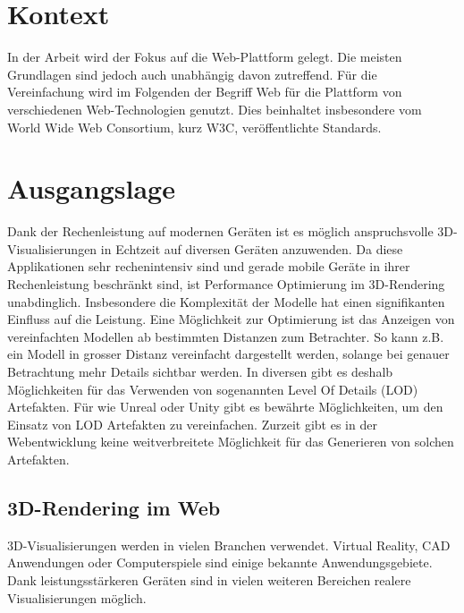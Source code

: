 
\section{Kontext}
In der Arbeit wird der Fokus auf die Web-Plattform gelegt. Die meisten Grundlagen sind jedoch auch unabhängig davon zutreffend.
Für die Vereinfachung wird im Folgenden der Begriff Web für die Plattform von verschiedenen Web-Technologien genutzt. Dies beinhaltet insbesondere vom World Wide Web Consortium, kurz W3C, veröffentlichte Standards.

\section{Ausgangslage}
Dank der Rechenleistung auf modernen Geräten ist es möglich anspruchsvolle 3D-Visualisierungen in Echtzeit auf diversen Geräten anzuwenden. Da diese Applikationen sehr rechenintensiv sind und gerade mobile Geräte in ihrer Rechenleistung beschränkt sind, ist Performance Optimierung im 3D-Rendering unabdinglich. Insbesondere die Komplexität der Modelle hat einen signifikanten Einfluss auf die Leistung.
Eine Möglichkeit zur Optimierung ist das Anzeigen von vereinfachten Modellen ab bestimmten Distanzen zum Betrachter. So kann z.B. ein Modell in grosser Distanz vereinfacht dargestellt werden, solange bei genauer Betrachtung mehr Details sichtbar werden.
In diversen  gibt es deshalb Möglichkeiten für das Verwenden von sogenannten Level Of Details (LOD) Artefakten.
Für  wie Unreal oder Unity gibt es bewährte Möglichkeiten, um den Einsatz von LOD Artefakten zu vereinfachen. Zurzeit gibt es in der Webentwicklung keine weitverbreitete Möglichkeit für das Generieren von solchen Artefakten.

\subsection{3D-Rendering im Web}
3D-Visualisierungen werden in vielen Branchen verwendet.
Virtual Reality, CAD Anwendungen oder Computerspiele sind einige bekannte Anwendungsgebiete.
Dank leistungsstärkeren Geräten sind in vielen weiteren Bereichen realere Visualisierungen möglich.

